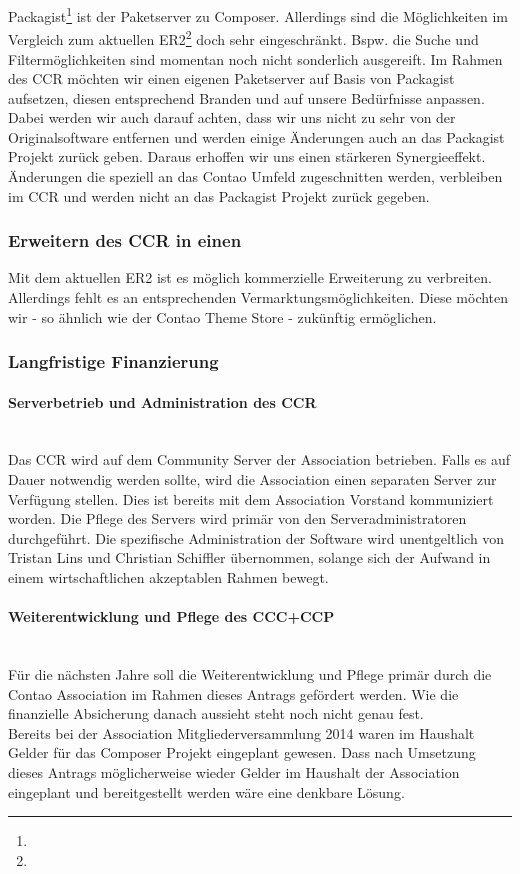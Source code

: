 \documentclass[
paper=a4,
draft=false,%
fontsize=10pt%
]{scrartcl}
\begin{document}
Packagist\footnote{} ist der Paketserver zu Composer. Allerdings sind die Möglichkeiten im Vergleich zum aktuellen ER2\footnote{} doch sehr eingeschränkt. Bspw. die Suche und Filtermöglichkeiten sind momentan noch nicht sonderlich ausgereift. Im Rahmen des CCR möchten wir einen eigenen Paketserver auf Basis von Packagist aufsetzen, diesen entsprechend Branden und auf unsere Bedürfnisse anpassen.\\
Dabei werden wir auch darauf achten, dass wir uns nicht zu sehr von der Originalsoftware entfernen und werden einige Änderungen auch an das Packagist Projekt zurück geben. Daraus erhoffen wir uns einen stärkeren Synergieeffekt. Änderungen die speziell an das Contao Umfeld zugeschnitten werden, verbleiben im CCR und werden nicht an das Packagist Projekt zurück gegeben.

\subsubsection{Erweitern des CCR in einen }

Mit dem aktuellen ER2 ist es möglich kommerzielle Erweiterung zu verbreiten. Allerdings fehlt es an entsprechenden Vermarktungsmöglichkeiten. Diese möchten wir - so ähnlich wie der Contao Theme Store - zukünftig ermöglichen.

\subsubsection{Langfristige Finanzierung}

\paragraph{Serverbetrieb und Administration des CCR} ~\\
Das CCR wird auf dem Community Server der Association betrieben. Falls es auf Dauer notwendig werden sollte, wird die Association einen separaten Server zur Verfügung stellen. Dies ist bereits mit dem Association Vorstand kommuniziert worden.
Die Pflege des Servers wird primär von den Serveradministratoren durchgeführt. Die spezifische Administration der Software wird unentgeltlich von Tristan Lins und Christian Schiffler übernommen, solange sich der Aufwand in einem wirtschaftlichen akzeptablen Rahmen bewegt.

\paragraph{Weiterentwicklung und Pflege des CCC+CCP} ~\\
Für die nächsten Jahre soll die Weiterentwicklung und Pflege primär durch die Contao Association im Rahmen dieses Antrags gefördert werden. Wie die finanzielle Absicherung danach aussieht steht noch nicht genau fest.\\
Bereits bei der Association Mitgliederversammlung 2014 waren im Haushalt Gelder für das Composer Projekt eingeplant gewesen. Dass nach Umsetzung dieses Antrags möglicherweise wieder Gelder im Haushalt der Association eingeplant und bereitgestellt werden wäre eine denkbare Lösung.
\end{document}
